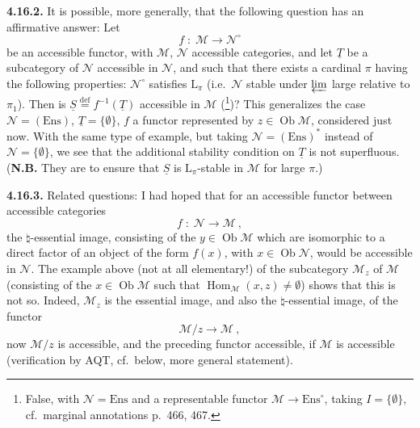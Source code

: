\documentclass[11pt]{article}
\newcommand{\msp}[1]{\marginpar{\footnotesize [#1]}}
\newcommand{\Hom}{\operatorname{Hom}}
\newcommand{\Ob}{\operatorname{Ob}}
\newcommand{\Ens}{\mathrm{Ens}}
\newcommand{\defeq}{\overset{\text{def}}{=}}
\begin{document}
\textbf{4.16.2.} It is possible, more generally, that the following question has an affirmative answer: Let
\[
f \;:\; \mathcal{M} \longrightarrow \mathcal{N}^\circ
\]
be an accessible functor, with $\mathcal{M}$, $\mathcal{N}$ accessible categories, and let $\underline{T}$ be a subcategory of $\mathcal{N}$ accessible in $\mathcal{N}$, and such that there exists a cardinal $\pi$ having the following properties: $\mathcal{N}^\circ$ satisfies $\mathrm{L}_\pi$ (i.e.\ $\mathcal{N}$ stable under $\varprojlim$ large relative to $\pi_1$). Then is $\underline{S} \defeq f^{-1}(\underline{T})$ accessible in $\mathcal{M}$ (\footnote[191]{False, with $\mathcal{N} = \Ens$ and a representable functor $\mathcal{M} \longrightarrow \Ens^\circ$, taking $I = \{\emptyset\}$, cf.\ marginal annotations p.~466, 467.})? This generalizes the case $\mathcal{N} = (\Ens)$, $\underline{T} = \{\emptyset\}$, $f$ a functor represented by $z \in \Ob\mathcal{M}$, considered just now. With the same type of example, but taking $\mathcal{N} = (\Ens)^*$
\msp{469}
instead of $\mathcal{N} = \{\emptyset\}$, we see that the additional stability condition on $\underline{T}$ is not
superfluous. (\textbf{N.B.} They are to ensure that $\underline{S}$ is $\mathrm{L}_\pi$-stable in $\mathcal{M}$ for large $\pi$.) %

\textbf{4.16.3.} Related questions: I had hoped that for an accessible functor between accessible categories %
\[
f \;:\; \mathcal{N} \longrightarrow \mathcal{M}\ ,
\]
the $\natural$-essential image, consisting of the $y \in \Ob\mathcal{M}$ which are isomorphic to a direct factor of an object of the form $f(x)$, with $x \in \Ob\mathcal{N}$, would be accessible in $\mathcal{N}$. The example above (not at all elementary!) of the subcategory $\mathcal{M}_z$ of $\mathcal{M}$ (consisting of the $x \in \Ob\mathcal{M}$ such that $\Hom_{\mathcal{M}}(x,z) \neq \emptyset$) shows that this is not so. Indeed, $\mathcal{M}_z$ is the essential image, and also the $\natural$-essential image, of the functor
\[
\mathcal{M}/z \longrightarrow \mathcal{M}\ ,
\]
now $\mathcal{M}/z$ is accessible, and the preceding functor accessible, if $\mathcal{M}$ is accessible (verification by AQT, cf.\ below, more general statement).

\msp{470}
\end{document}
